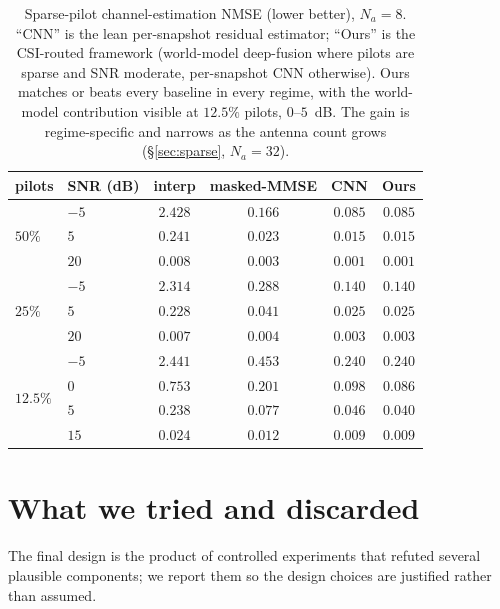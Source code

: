 \documentclass[11pt]{article}
\begin{document}
\begin{table}[h]
\centering
\small
\begin{tabular}{llcccc}
\toprule
pilots & SNR (dB) & interp & masked-MMSE & CNN & \textbf{Ours} \\
\midrule
\multirow{3}{*}{$50\%$}
& $-5$ & $2.428$ & $0.166$ & $\mathbf{0.085}$ & $\mathbf{0.085}$ \\
& $5$  & $0.241$ & $0.023$ & $\mathbf{0.015}$ & $\mathbf{0.015}$ \\
& $20$ & $0.008$ & $0.003$ & $\mathbf{0.001}$ & $\mathbf{0.001}$ \\
\midrule
\multirow{3}{*}{$25\%$}
& $-5$ & $2.314$ & $0.288$ & $\mathbf{0.140}$ & $\mathbf{0.140}$ \\
& $5$  & $0.228$ & $0.041$ & $\mathbf{0.025}$ & $\mathbf{0.025}$ \\
& $20$ & $0.007$ & $0.004$ & $\mathbf{0.003}$ & $\mathbf{0.003}$ \\
\midrule
\multirow{4}{*}{$12.5\%$}
& $-5$ & $2.441$ & $0.453$ & $\mathbf{0.240}$ & $\mathbf{0.240}$ \\
& $0$  & $0.753$ & $0.201$ & $0.098$ & $\mathbf{0.086}$ \\
& $5$  & $0.238$ & $0.077$ & $0.046$ & $\mathbf{0.040}$ \\
& $15$ & $0.024$ & $0.012$ & $0.009$ & $\mathbf{0.009}$ \\
\bottomrule
\end{tabular}
\caption{Sparse-pilot channel-estimation NMSE (lower better), $N_a{=}8$. ``CNN'' is the lean
per-snapshot residual estimator; ``Ours'' is the CSI-routed framework (world-model deep-fusion where
pilots are sparse and SNR moderate, per-snapshot CNN otherwise). Ours matches or beats every baseline
in every regime, with the world-model contribution visible at $12.5\%$ pilots, $0$--$5$~dB. The gain
is regime-specific and narrows as the antenna count grows (\S\ref{sec:sparse}, $N_a{=}32$).}
\label{tab:est}
\end{table}

\section{What we tried and discarded}\label{sec:discarded}

The final design is the product of controlled experiments that refuted several plausible components;
we report them so the design choices are justified rather than assumed.
\end{document}
